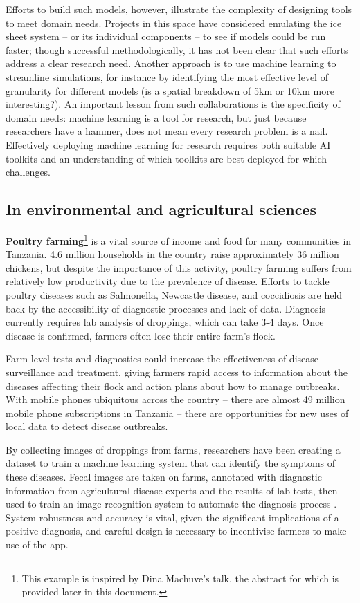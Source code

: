 Efforts to build such models, however, illustrate the complexity of
designing tools to meet domain needs. Projects in this space have
considered emulating the ice sheet system -- or its individual
components -- to see if models could be run faster; though successful
methodologically, it has not been clear that such efforts address a
clear research need. Another approach is to use machine learning to
streamline simulations, for instance by identifying the most effective
level of granularity for different models (is a spatial breakdown of 5km
or 10km more interesting?). An important lesson from such collaborations
is the specificity of domain needs: machine learning is a tool for
research, but just because researchers have a hammer, does not mean
every research problem is a nail. Effectively deploying machine learning
for research requires both suitable AI toolkits and an understanding of
which toolkits are best deployed for which challenges.

\subsection{In environmental and agricultural
sciences}\label{in-environmental-and-agricultural-sciences}

\noindent\textbf{Poultry farming}\footnote{This example is inspired by Dina
  Machuve's talk, the abstract for which is provided later in this
  document.} is a vital source of income and food for many communities
in Tanzania. 4.6 million households in the country raise approximately
36 million chickens, but despite the importance of this activity,
poultry farming suffers from relatively low productivity due to the
prevalence of disease. Efforts to tackle poultry diseases such as
Salmonella, Newcastle disease, and coccidiosis are held back by the
accessibility of diagnostic processes and lack of data. Diagnosis
currently requires lab analysis of droppings, which can take 3-4 days.
Once disease is confirmed, farmers often lose their entire farm's flock.

Farm-level tests and diagnostics could increase the effectiveness of
disease surveillance and treatment, giving farmers rapid access to
information about the diseases affecting their flock and action plans
about how to manage outbreaks. With mobile phones ubiquitous across the
country -- there are almost 49 million mobile phone subscriptions in
Tanzania -- there are opportunities for new uses of local data to detect
disease outbreaks.

By collecting images of droppings from farms, researchers have been
creating a dataset to train a machine learning system that can
identify the symptoms of these diseases. Fecal images are taken on
farms, annotated with diagnostic information from agricultural disease
experts and the results of lab tests, then used to train an image
recognition system to automate the diagnosis process
\cite{Machuve-poultry22}. System robustness and accuracy is vital,
given the significant implications of a positive diagnosis, and
careful design is necessary to incentivise farmers to make use of the
app.

